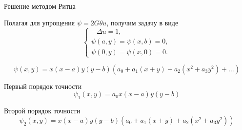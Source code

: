 \documentclass[ignoreonframetext,unicode]{beamer}
\begin{document}
\begin{frame}{Решение методом Ритца}
		\begin{block}{Полагая для упрощения $\psi = 2G \theta u$, получим задачу в виде}	
\[
\begin{cases}
	-\Delta u = 1, \\
	\psi(a, y) =  \psi(x,b) = 0, \\
	\psi(0, y) =  \psi(x,0) = 0.
\end{cases}
\]
	\end{block}

\begin{block}{}	
\[
\psi(x, y) = x(x - a)y(y - b)\left(a_0 + a_1\left(x + y\right) + a_2\left(x^2 + a_3 y^2\right) + \ldots\right)
\]
\end{block}

	\begin{block}{Первый порядок точности}	
		\[
			\psi_1(x, y) = a_0 x(x - a)y(y - b)
		\]
	\end{block}

	\begin{block}{Второй порядок точности}	
	\[
		\psi_2(x, y) = x(x - a)y(y - b)\left(a_0 + a_1\left(x + y\right) + a_2\left(x^2 + a_3 y^2\right)\right)
	\]
\end{block}

\end{frame}
\end{document}
